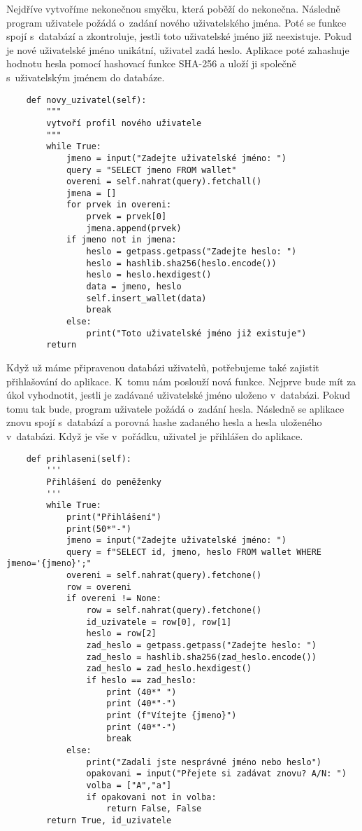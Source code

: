 \documentclass[12pt]{report}			%
\begin{document}
{{Nejdříve vytvoříme nekonečnou smyčku, která poběží do nekonečna. Následně program uživatele požádá o~zadání nového uživatelského jména. Poté se funkce spojí s~databází a zkontroluje, jestli toto uživatelské jméno již neexistuje. Pokud je nové uživatelské jméno unikátní, uživatel zadá heslo. Aplikace poté zahashuje hodnotu hesla pomocí hashovací funkce SHA-256 a uloží ji společně s~uživatelským jménem do databáze.
\begin{lstlisting} 
    def novy_uzivatel(self):
        """
        vytvoří profil nového uživatele
        """
        while True:
            jmeno = input("Zadejte uživatelské jméno: ")
            query = "SELECT jmeno FROM wallet"
            overeni = self.nahrat(query).fetchall()
            jmena = []
            for prvek in overeni:
                prvek = prvek[0]
                jmena.append(prvek)
            if jmeno not in jmena:
                heslo = getpass.getpass("Zadejte heslo: ")
                heslo = hashlib.sha256(heslo.encode())
                heslo = heslo.hexdigest()
                data = jmeno, heslo
                self.insert_wallet(data)
                break
            else:
                print("Toto uživatelské jméno již existuje")
        return 
\end{lstlisting} 

Když už máme připravenou databázi uživatelů, potřebujeme také zajistit přihlašování do aplikace. K~tomu nám poslouží nová funkce. Nejprve bude mít za úkol vyhodnotit, jestli je zadávané uživatelské jméno uloženo v~databázi. Pokud tomu tak bude, program uživatele požádá o~zadání hesla. Následně se aplikace znovu spojí s~databází a porovná hashe zadaného hesla a hesla uloženého v~databázi. Když je vše v~pořádku, uživatel je přihlášen do aplikace.
\begin{lstlisting} 
    def prihlaseni(self): 
        '''
        Přihlášení do peněženky
        '''
        while True:
            print("Přihlášení")   
            print(50*"-") 
            jmeno = input("Zadejte uživatelské jméno: ")
            query = f"SELECT id, jmeno, heslo FROM wallet WHERE jmeno='{jmeno}';"
            overeni = self.nahrat(query).fetchone()
            row = overeni
            if overeni != None:
                row = self.nahrat(query).fetchone()
                id_uzivatele = row[0], row[1]
                heslo = row[2]
                zad_heslo = getpass.getpass("Zadejte heslo: ")
                zad_heslo = hashlib.sha256(zad_heslo.encode())
                zad_heslo = zad_heslo.hexdigest()
                if heslo == zad_heslo:
                    print (40*" ")
                    print (40*"-")
                    print (f"Vítejte {jmeno}")
                    print (40*"-")
                    break
            else:
                print("Zadali jste nesprávné jméno nebo heslo")
                opakovani = input("Přejete si zadávat znovu? A/N: ")
                volba = ["A","a"]
                if opakovani not in volba:
                    return False, False
        return True, id_uzivatele
\end{lstlisting}
} 
}
\end{document}
